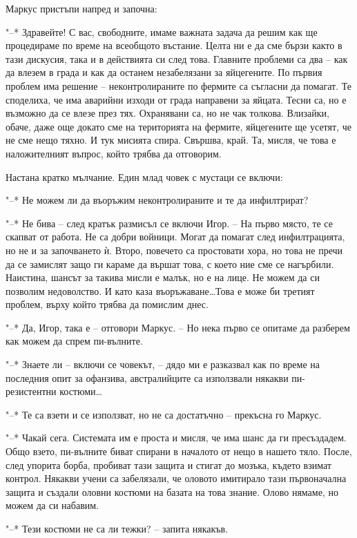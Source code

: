 \documentclass[ebook,openany,12pt]{memoir}
\begin{document}
Маркус пристъпи напред и започна:

"--* Здравейте! С вас, свободните, имаме важната задача да решим как ще процедираме по време на всеобщото въстание. Целта ни е да сме бързи както в тази дискусия, така и в действията си след това. Главните проблеми са два – как да влезем в града и как да останем незабелязани за яйцегените. По първия проблем има решение – неконтролираните по фермите са съгласни да помагат. Те споделиха, че има аварийни изходи от града направени за яйцата. Тесни са, но е възможно да се влезе през тях. Охранявани са, но не чак толкова. Влизайки, обаче, даже още докато сме на територията на фермите, яйцегените ще усетят, че не сме нещо тяхно. И тук мисията спира. Свършва, край. Та, мисля, че това е наложителният въпрос, който трябва да отговорим.

Настана кратко мълчание. Един млад човек с мустаци се включи:

"--* Не можем ли да въоръжим неконтролираните и те да инфилтрират?

"--* Не бива – след кратък размисъл се включи Игор. – На първо място, те се скапват от работа. Не са добри войници. Могат да помагат след инфилтрацията, но не и за започването ѝ. Второ, повечето са простовати хора, но това не пречи да се замислят защо ги караме да вършат това, с което ние сме се нагърбили. Наистина, шансът за такива мисли е малък, но е на лице. Не можем да си позволим недоволство. И като каза въоръжаване\ldots Това е може би третият проблем, върху който трябва да помислим днес.

"--* Да, Игор, така е – отговори Маркус. – Но нека първо се опитаме да разберем как можем да спрем пи-вълните.

"--* Знаете ли – включи се човекът, – дядо ми е разказвал как по време на последния опит за офанзива, австралийците са използвали някакви пи-резистентни костюми\ldots

"--* Те са взети и се използват, но не са достатъчно – прекъсна го Маркус.

"--* Чакай сега. Системата им е проста и мисля, че има шанс да ги пресъздадем. Общо взето, пи-вълните биват спирани в началото от нещо в нашето тяло. После, след упорита борба, пробиват тази защита и стигат до мозъка, където взимат контрол. Някакви учени са забелязали, че оловото имитирало тази първоначална защита и създали оловни костюми на базата на това знание. Олово нямаме, но можем да си набавим.

"--* Тези костюми не са ли тежки? – запита някакъв.
\end{document}
